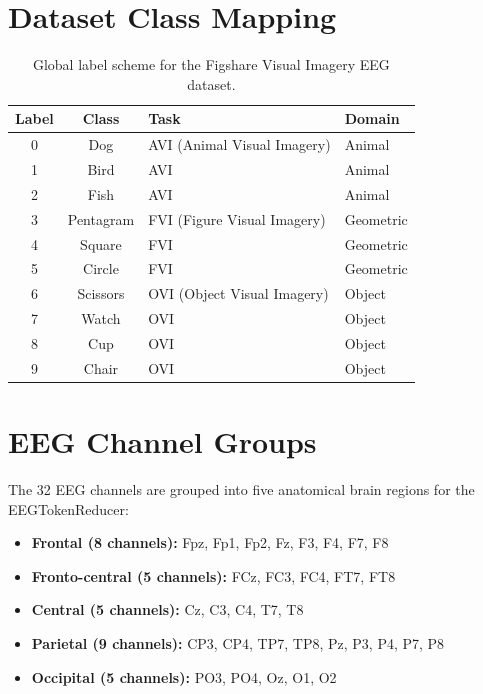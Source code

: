 \documentclass{article}
\begin{document}
\section{Dataset Class Mapping}
\label{app:class_mapping}

\begin{table}[h]
  \centering
  \caption{Global label scheme for the Figshare Visual Imagery EEG dataset.}
  \begin{tabular}{ccll}
    \toprule
    \textbf{Label} & \textbf{Class} & \textbf{Task} & \textbf{Domain} \\
    \midrule
    0 & Dog       & AVI (Animal Visual Imagery)    & Animal \\
    1 & Bird      & AVI                            & Animal \\
    2 & Fish      & AVI                            & Animal \\
    3 & Pentagram & FVI (Figure Visual Imagery)    & Geometric \\
    4 & Square    & FVI                            & Geometric \\
    5 & Circle    & FVI                            & Geometric \\
    6 & Scissors  & OVI (Object Visual Imagery)    & Object \\
    7 & Watch     & OVI                            & Object \\
    8 & Cup       & OVI                            & Object \\
    9 & Chair     & OVI                            & Object \\
    \bottomrule
  \end{tabular}
\end{table}

\section{EEG Channel Groups}
\label{app:channels}

The 32 EEG channels are grouped into five anatomical brain regions for the EEGTokenReducer:
\begin{itemize}[noitemsep]
  \item \textbf{Frontal (8 channels):} Fpz, Fp1, Fp2, Fz, F3, F4, F7, F8
  \item \textbf{Fronto-central (5 channels):} FCz, FC3, FC4, FT7, FT8
  \item \textbf{Central (5 channels):} Cz, C3, C4, T7, T8
  \item \textbf{Parietal (9 channels):} CP3, CP4, TP7, TP8, Pz, P3, P4, P7, P8
  \item \textbf{Occipital (5 channels):} PO3, PO4, Oz, O1, O2
\end{itemize}
\end{document}
